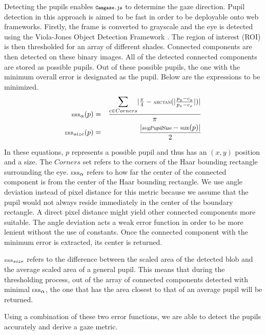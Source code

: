 \documentclass[annual]{acmsiggraph}
\newcommand{\Acronym}[1]{\ensuremath{{\small{\texttt{#1}}}}}
\newcommand{\Name}{\Acronym{Camgaze.js}} \newcommand{\False}{\Constant{false}}
\newcommand{\Function}[1]{\ensuremath{{\small \textsc{#1}}}}
\newcommand{\Constant}[1]{\ensuremath{\small{\texttt{#1}}}}
\newcommand{\Var}[1]{\ensuremath{{\small{\textsl{#1}}}}}
\begin{document}
Detecting the pupils enables $\Name$ to determine the gaze direction.
Pupil detection in this approach is aimed to be fast in order to be deployable
onto web frameworks. Firstly, the frame is converted to grayscale and the eye
is detected using the Viola-Jones Object Detection Framework \cite{Viola01}.
The region of interest (ROI) is then thresholded for an array of different
shades. Connected components are then detected on these binary images. All of
the detected connected components are stored as possible pupils.  Out of these
possible pupils, the one with the minimum overall error is designated as the
pupil.  Below are the expressions to be minimized.  \begin{eqnarray}
\Function{err}_{\alpha}(p) &=& \frac{ \mathlarger{\sum}_{c \in Corners}{ \vert
\frac{\pi}{4} - \Function{arctan}( \vert \frac{p_y - c_y}{p_x - c_x} \vert)
\vert } }{\pi} \\ \Function{err}_{size}(p) &=& \frac{ \vert \Var{avgPupilSize}
- \Function{size}(p) \vert }{2} \end{eqnarray}

In these equations, $p$ represents a possible pupil and thus has an $(x, y)$
position and a size. The $Corners$ set refers to the corners of the Haar
bounding rectangle surrounding the eye. $\Function{err}_{\alpha}$ refers to how
far the center of the connected component is from the center of the Haar
bounding rectangle.  We use angle deviation instead of pixel distance for this
metric because we assume that the pupil would not always reside immediately in
the center of the boundary rectangle. A direct pixel distance might yield other
connected components more suitable.  The angle deviation acts a weak error
function in order to be more lenient without the use of constants.  Once the
connected component with the minimum error is extracted, its center is
returned.

$\Function{err}_{size}$ refers to the difference between the scaled area of the
detected blob and the average scaled area of a general pupil. This means that
during the thresholding process, out of the  array of connected components
detected with minimal $\Function{err}_{\alpha}$, the one that has the area
closest to that of an average pupil will be returned.

Using a combination of these two error functions, we are able to detect the
pupils accurately and derive a gaze metric.
\end{document}
